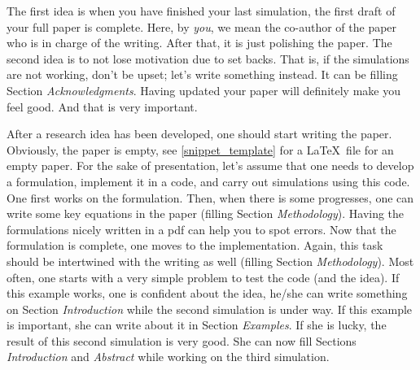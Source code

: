 \documentclass[authoryear,3p,times,preprint,review,fleqn]{elsarticle}
\numberwithin{equation}{section}
\theoremstyle{remark}
\begin{document}
The first idea is when you have finished your last simulation, the first draft of your full paper is complete. Here, by \textit{you}, we mean the co-author of the paper who is in charge of the writing. After that, it is just polishing the paper. The second idea is to not lose motivation due to set backs. That is, if the simulations are not working, don't be upset; let's write something instead. It can be filling Section \textit{Acknowledgments}. Having updated your paper will definitely make you feel good. And that is very important. 


After a research idea has been developed, one should start writing the paper. Obviously, the paper is empty, see \cref{snippet_template} for a \LaTeX\ file for an empty paper.
For the sake of presentation, let's assume that one needs to develop a formulation, implement it in a code, and carry out simulations using this code. One first works on the formulation. Then, when there is some progresses, one can write some key equations in the paper (filling Section \textit{Methodology}). Having the formulations nicely written in a pdf can help you to spot errors. Now that the formulation is complete, one moves to the implementation. Again, this task should be intertwined  with the writing as well (filling Section \textit{Methodology}). Most often, one starts with a very simple problem to test the code (and the idea). If this example works, one is confident about the idea, he/she can write something on Section \textit{Introduction} while the second simulation is under way. If this example is important, she can write about it in Section \textit{Examples}. If she is lucky, the result of this second simulation is very good. She can now fill  Sections \textit{Introduction} and  \textit{Abstract} while working on the third simulation.
\begin{figure}[!h]
\end{figure}
\end{document}
